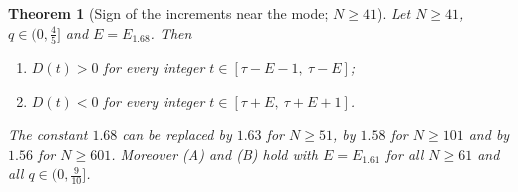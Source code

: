 \documentclass[11pt,a4paper]{article}
\newtheorem{theorem}{Theorem}[section]
\theoremstyle{definition}
\theoremstyle{remark}
\begin{document}
\begin{theorem}[Sign of the increments near the mode; $N\ge41$]\label{thm:local}
Let $N\ge41$, $q\in(0,\frac45]$ and $E=E_{1.68}$. Then
\begin{enumerate}
\item[(A)] $D(t)>0$ for every integer $t\in[\tau-E-1,\ \tau-E]$;
\item[(B)] $D(t)<0$ for every integer $t\in[\tau+E,\ \tau+E+1]$.
\end{enumerate}
The constant $1.68$ can be replaced by $1.63$ for $N\ge51$, by $1.58$ for $N\ge101$ and by $1.56$ for $N\ge601$.
Moreover (A) and (B) hold with $E=E_{1.61}$ for all $N\ge61$ and all $q\in(0,\frac9{10}]$.
\end{theorem}
\end{document}
